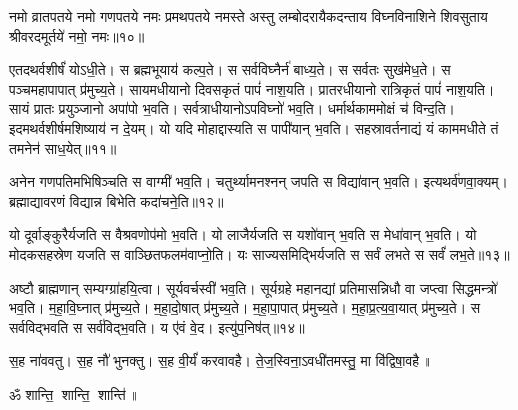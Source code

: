 नमो व्रातपतये नमो गणपतये नमः प्रमथपतये नमस्ते अस्तु लम्बोदरायैकदन्ताय विघ्नविनाशिने शिवसुताय श्रीवरदमू‍र्तये॑ नमो॒ नमः॥१०॥

एतदथर्वशीर्षं॑ योऽधी॒ते। स ब्रह्मभूयाय॑ कल्प॒ते।  स सर्वविघ्नैर्न॑ बाध्य॒ते।
स सर्वतः सुख॑मेध॒ते।  स पञ्चमहापापात् प्र॑मुच्य॒ते।
सायमधीयानो दिवसकृतं पापं॑ नाश॒यति।  प्रातरधीयानो रात्रिकृतं पापं॑ नाश॒यति।
सायं प्रातः प्रयुञ्जानो अपा॑पो भ॒वति।  सर्वत्राधीयानोऽपविघ्नो॑ भव॒ति।
धर्मार्थकाममोक्षं च॑ विन्द॒ति। इदमथर्वशीर्षमशिष्याय॑ न दे॒यम्।  यो यदि मोहाद्दास्यति स पापी॑यान् भ॒वति।
सहस्रावर्तनाद्यं यं काममधीते तं तमनेन॑ साध॒येत्॥११॥

अनेन गणपतिमभिषिञ्चति स वाग्मी॑ भव॒ति।  चतुर्थ्यामनश्नन् जपति स विद्या॑वान् भ॒वति।  इत्यथर्व॑णवा॒क्यम्। ब्रह्माद्यावरणं विद्यान्न बिभेति कदा॑चने॒ति॥१२॥

यो दूर्वाङ्कुरैर्यजति स वैश्रवणोप॑मो भ॒वति। यो लाजैर्यजति स यशो॑वान् भ॒वति स मेधा॑वान् भ॒वति। 
यो मोदकसहस्रेण यजति स वाञ्छितफलम॑वाप्नो॒ति। यः साज्यसमिद्भिर्यजति स सर्वं लभते स सर्वं॑ लभ॒ते॥१३॥

अष्टौ ब्राह्मणान् सम्यग्ग्रा॑हयि॒त्वा। सूर्यवर्चस्वी॑ भव॒ति।
सूर्यग्रहे महानद्यां प्रतिमासन्निधौ वा जप्त्वा सिद्धमन्त्रो॑ भव॒ति।
म॒हा॒वि॒घ्नात् प्र॑मुच्य॒ते।  म॒हा॒दो॒षात् प्र॑मुच्य॒ते। म॒हा॒पा॒पात् प्र॑मुच्य॒ते।
म॒हा॒प्र॒त्य॒वा॒यात् प्र॑मुच्य॒ते। स सर्वविद्भवति स सर्व॑विद्भ॒वति। य ए॑वं वे॒द।  इत्यु॑प॒निष॑त्॥१४॥

स॒ह ना॑ववतु। स॒ह नौ॑ भुनक्तु। स॒ह वी॒र्यं॑ करवावहै।
ते॒ज॒स्विना॒ऽवधी॑तमस्तु॒ मा वि॑द्विषा॒वहै॥

\centerline{ॐ शान्ति॒ शान्ति॒ शान्ति॑॥}